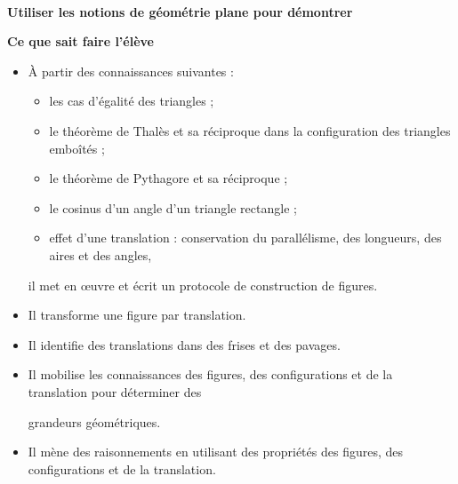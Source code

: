 \documentclass[10pt]{article}
\newcommand{\RR}{\begin{tikzpicture} \draw[BleuRoi,fill=BleuRoi] (0,0) circle (0.06); \end{tikzpicture}}
\newcommand{\competence}[1]{\par\color{BleuRoi}\makebox[\linewidth]{\rule{\textwidth}{2pt}}\\{\bfseries\Large#1}\color{black}\vspace{1em}}
\newenvironment{savoireleves}{%
    \renewcommand{\labelitemi}{\RR}%
    \color{black}%
    \par\textbf{Ce que sait faire l'élève}
    \begin{itemize}
    \setlength{\itemsep}{-0.2em}%
}{
    \end{itemize}
}
\newenvironment{sousitemize}{
    \color{black}%
    \vspace{-1em}%
    \begin{itemize}
    \setlength{\itemsep}{0em}%
}{
    \end{itemize}
}
\begin{document}
    \competence{Utiliser les notions de géométrie plane pour démontrer}
    \begin{savoireleves}
        \item À partir des connaissances suivantes :
        \begin{sousitemize}
            \item les cas d’égalité des triangles ;
            \item le théorème de Thalès et sa réciproque dans la configuration des triangles emboîtés ;
            \item le théorème de Pythagore et sa réciproque ;
            \item le cosinus d’un angle d’un triangle rectangle ;
            \item effet d’une translation : conservation du parallélisme, des longueurs, des aires et des angles,
        \end{sousitemize}
        il met en \oe{}uvre et écrit un protocole de construction de figures.
        \item Il transforme une figure par translation.
        \item Il identifie des translations dans des frises et des pavages.

        \clearpage
        \item Il mobilise les connaissances des figures, des configurations et de la translation pour déterminer des \raggedright{grandeurs géométriques.}
        \item Il mène des raisonnements en utilisant des propriétés des figures, des configurations et de la translation.
    \end{savoireleves}
\end{document}
